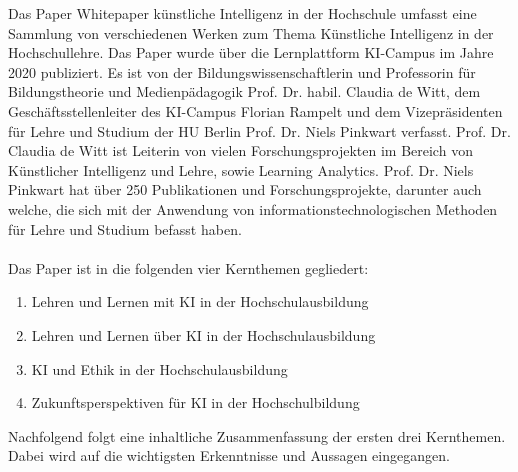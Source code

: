 
Das Paper \glqq{}Whitepaper künstliche Intelligenz in der Hochschule\grqq{} umfasst eine Sammlung von verschiedenen Werken zum Thema Künstliche Intelligenz in der Hochschullehre. Das Paper wurde über die Lernplattform KI-Campus im Jahre 2020 publiziert. Es ist von der Bildungswissenschaftlerin und Professorin für Bildungstheorie und Medienpädagogik Prof. Dr. habil. Claudia de Witt, dem Geschäftsstellenleiter des KI-Campus Florian Rampelt und dem Vizepräsidenten für Lehre und Studium der HU Berlin Prof. Dr. Niels Pinkwart verfasst. Prof. Dr. Claudia de Witt ist Leiterin von vielen Forschungsprojekten im Bereich von Künstlicher Intelligenz und Lehre, sowie Learning Analytics. Prof. Dr. Niels Pinkwart hat über 250 Publikationen und Forschungsprojekte, darunter auch welche, die sich mit der Anwendung von informationstechnologischen Methoden für Lehre und Studium befasst haben.
\\ \\ \noindent
Das Paper ist in die folgenden vier Kernthemen gegliedert:
\begin{enumerate}
    \item Lehren und Lernen mit KI in der Hochschulausbildung
    \item Lehren und Lernen über KI in der Hochschulausbildung
    \item KI und Ethik in der Hochschulausbildung
    \item Zukunftsperspektiven für KI in der Hochschulbildung
\end{enumerate}
\noindent
Nachfolgend folgt eine inhaltliche Zusammenfassung der ersten drei Kernthemen. Dabei wird auf die wichtigsten Erkenntnisse und Aussagen eingegangen.

